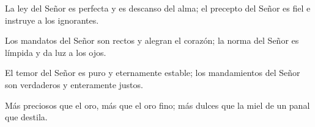 \begin{psbody}
La ley del Señor es perfecta 
y es descanso del alma; 
el precepto del Señor es fiel 
e instruye a los ignorantes. 

Los mandatos del Señor son rectos 
y alegran el corazón; 
la norma del Señor es límpida 
y da luz a los ojos. 

El temor del Señor es puro 
y eternamente estable; 
los mandamientos del Señor son verdaderos 
y enteramente justos. 

Más preciosos que el oro, 
más que el oro fino; 
más dulces que la miel 
de un panal que destila. 
\end{psbody}

\newpage


 


